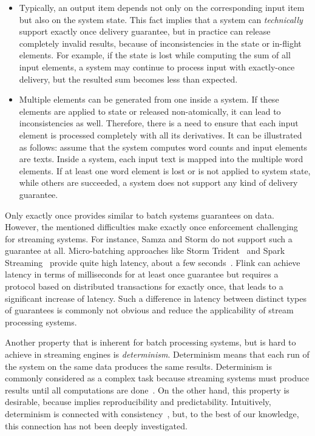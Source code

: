\begin{itemize}
    \item Typically, an output item depends not only on the corresponding input item but also on the system state. This fact implies that a system can {\em technically} support exactly once delivery guarantee, but in practice can release completely invalid results, because of inconsistencies in the state or in-flight elements. For example, if the state is lost while computing the sum of all input elements, a system may continue to process input with exactly-once delivery, but the resulted sum becomes less than expected. 
    \item Multiple elements can be generated from one inside a system. If these elements are applied to state or released non-atomically, it can lead to inconsistencies as well. Therefore, there is a need to ensure that each input element is processed completely with all its derivatives. It can be illustrated as follows: assume that the system computes word counts and input elements are texts. Inside a system, each input text is mapped into the multiple word elements. If at least one word element is lost or is not applied to system state, while others are succeeded, a system does not support any kind of delivery guarantee. 
\end{itemize}

Only exactly once provides similar to batch systems guarantees on data. However, the mentioned difficulties make exactly once enforcement challenging for streaming systems. For instance, Samza and Storm do not support such a guarantee at all. Micro-batching approaches like Storm Trident~\cite{apache:storm:trident} and Spark Streaming~\cite{Zaharia:2012:DSE:2342763.2342773} provide quite high latency, about a few seconds~\cite{7530084, 7474816}. Flink can achieve latency in terms of milliseconds for at least once guarantee but requires a protocol based on distributed transactions for exactly once, that leads to a significant increase of latency. Such a difference in latency between distinct types of guarantees is commonly not obvious and reduce the applicability of stream processing systems.

Another property that is inherent for batch processing systems, but is hard to achieve in streaming engines is {\em determinism}. Determinism means that each run of the system on the same data produces the same results. Determinism is commonly considered as a complex task because streaming systems must produce results until all computations are done~\cite{Zacheilas:2017:MDS:3093742.3093921}. On the other hand, this property is desirable, because implies reproducibility and predictability. Intuitively, determinism is connected with consistency~\cite{Stonebraker:2005:RRS:1107499.1107504}, but, to the best of our knowledge, this connection has not been deeply investigated. 

